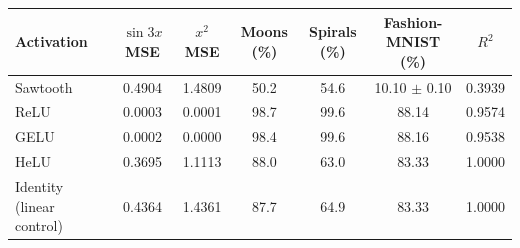 \begin{tabular}{lcccccc}
\toprule
Activation & $\sin 3x$ MSE & $x^2$ MSE & Moons (\%) & Spirals (\%) & Fashion-MNIST (\%) & $R^2$ \\
\midrule
Sawtooth & 0.4904 & 1.4809 & 50.2 & 54.6 & 10.10 $\pm$ 0.10 & 0.3939 \\
\midrule
ReLU & 0.0003 & 0.0001 & 98.7 & 99.6 & 88.14 & 0.9574 \\
GELU & 0.0002 & 0.0000 & 98.4 & 99.6 & 88.16 & 0.9538 \\
HeLU & 0.3695 & 1.1113 & 88.0 & 63.0 & 83.33 & 1.0000 \\
Identity (linear control) & 0.4364 & 1.4361 & 87.7 & 64.9 & 83.33 & 1.0000 \\
\bottomrule
\end{tabular}
